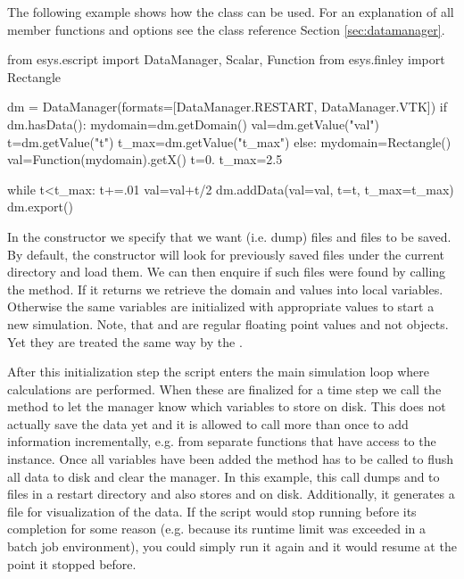 The following example shows how the  class can be used.
For an explanation of all member functions and options see the class reference
Section \ref{sec:datamanager}.
\begin{python}
  from esys.escript import DataManager, Scalar, Function
  from esys.finley import Rectangle

  dm = DataManager(formats=[DataManager.RESTART, DataManager.VTK])
  if dm.hasData():
    mydomain=dm.getDomain()
    val=dm.getValue("val")
    t=dm.getValue("t")
    t_max=dm.getValue("t_max")
  else:
    mydomain=Rectangle()
    val=Function(mydomain).getX()
    t=0.
    t_max=2.5

  while t<t_max:
    t+=.01
    val=val+t/2
    dm.addData(val=val, t=t, t_max=t_max)
    dm.export()
\end{python}
In the constructor we specify that we want  (i.e. dump) files
and  files to be saved.
By default, the constructor will look for previously saved 
files under the current directory and load them.
We can then enquire if such files were found by calling the 
method. If it returns \True we retrieve the domain and values into local
variables. Otherwise the same variables are initialized with appropriate
values to start a new simulation.
Note, that  and  are regular floating point values and not
\Data objects. Yet they are treated the same way by the .

After this initialization step the script enters the main simulation loop
where calculations are performed.
When these are finalized for a time step we call the  method
to let the manager know which variables to store on disk.
This does not actually save the data yet and it is allowed to call
 more than once to add information incrementally, e.g. from
separate functions that have access to the  instance.
Once all variables have been added the  method has to be called
to flush all data to disk and clear the manager.
In this example, this call dumps  and  to files
in a restart directory and also stores  and  on disk.
Additionally, it generates a \VTK file for visualization of the data.
If the script would stop running before its completion for some reason (e.g.
because its runtime limit was exceeded in a batch job environment), you could
simply run it again and it would resume at the point it stopped before.

